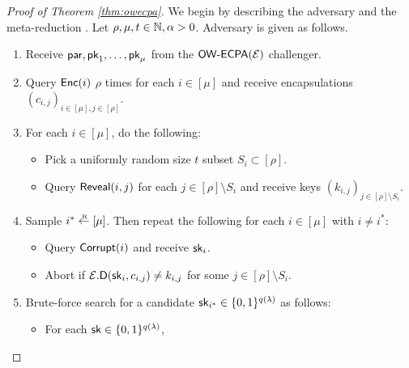 \begin{corollary}
\end{corollary}

\begin{corollary}
\end{corollary}

\begin{proof}[Proof of Theorem \ref{thm:owecpa}]
  We begin by describing the adversary \advA and the meta-reduction \redM.
  Let \(\rho, \mu, t \in \mathbb{N}, \alpha > 0\). Adversary \advA is given as follows.

  \begin{enumerate}[itemsep=0.1cm]
    \item Receive \(\mathsf{par}, \mathsf{pk}_{1}, \ldots, \mathsf{pk}_{\mu}\) from the \(\mathsf{OW}\text{-}\mathsf{ECPA}(\mathcal{E})\) challenger.
    \item Query \(\mathsf{Enc}(i)\) \(\rho\) times for each \(i \in [\mu]\) and receive encapsulations \((c_{i,j})_{i \in [\mu], j \in [\rho]}\).
    \item For each \(i \in [\mu]\), do the following:
          \begin{itemize}[label={\textbullet},itemsep=0.1cm]
            \item Pick a uniformly random size \(t\) subset \(S_{i} \subset [\rho]\).
            \item Query \(\mathsf{Reveal}(i,j)\) for each \(j \in [\rho] \setminus S_{i}\)
                  and receive keys \((k_{i,j})_{j \in [\rho] \setminus S_{i}}\).
          \end{itemize}
    \item\label{advA:corrupt} Sample \(i^{*} \sampleR [\mu]\). Then repeat the following for each \(i \in [\mu]\) with \(i \ne i^{*}\):
          \begin{itemize}[label={\textbullet},itemsep=0.1cm]
            \item Query \(\mathsf{Corrupt}(i)\) and receive \(\mathsf{sk}_{i}\).
            \item Abort if \(\mathcal{E}.\mathsf{D}(\mathsf{sk}_{i},c_{i,j}) \ne k_{i,j}\) for some \(j \in [\rho] \setminus S_{i}\).
          \end{itemize}
     \item\label{advA:brute} Brute-force search for a candidate \(\mathsf{sk}_{i^{*}} \in \{0,1\}^{q(\lambda)}\) as follows:
          \begin{itemize}[label={\textbullet},itemsep=0.1cm]
            \item For each \(\mathsf{sk} \in \{0,1\}^{q(\lambda)}\),

\end{itemize}
\end{enumerate}
\end{proof}
